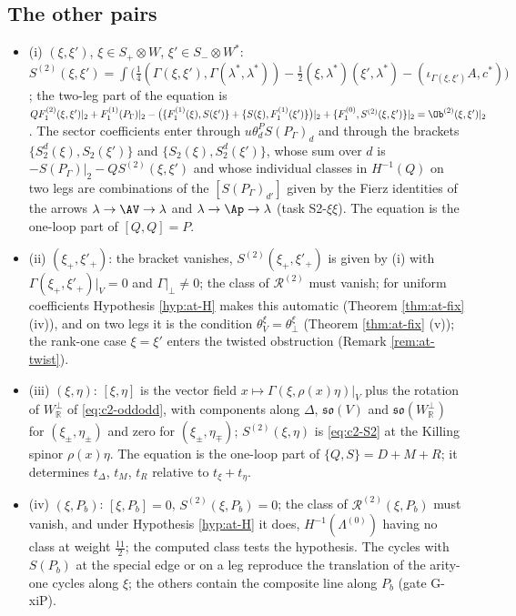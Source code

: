\subsection{The other pairs}

\begin{proposition}
\label{prop:at-pairs}
\leavevmode
\begin{itemize}
\item (i) $(\xi,\xi')$, $\xi\in S_+\otimes W$, $\xi'\in S_-\otimes W^*$: $S^{(2)}(\xi,\xi')=\int\big(\tfrac14(\Gamma(\xi,\xi'),\Gamma(\lambda^*,\lambda^*))-\tfrac12(\xi,\lambda^*)(\xi',\lambda^*)-(\iota_{\Gamma(\xi,\xi')}A,c^*)\big)$; the two-leg part of the equation is $QF_1^{(2)}(\xi,\xi')|_2+F_1^{(1)}(P_\Gamma)|_2-\big(\{F_1^{(1)}(\xi),S(\xi')\}+\{S(\xi),F_1^{(1)}(\xi')\}\big)|_2+\{F_1^{(0)},S^{(2)}(\xi,\xi')\}|_2=\Ob^{(2)}(\xi,\xi')|_2$. The sector coefficients enter through $u\theta^{P}_dS(P_\Gamma)_d$ and through the brackets $\{S^d_2(\xi),S_2(\xi')\}$ and $\{S_2(\xi),S^d_2(\xi')\}$, whose sum over $d$ is $-S(P_\Gamma)|_2-QS^{(2)}(\xi,\xi')$ and whose individual classes in $H^{-1}(Q)$ on two legs are combinations of the $[S(P_\Gamma)_{d'}]$ given by the Fierz identities of the arrows $\lambda\to\AV\to\lambda$ and $\lambda\to\Ap\to\lambda$ (task S2-$\xi\xi$). The equation is the one-loop part of $[Q,Q]=P$.
\item (ii) $(\xi_+,\xi'_+)$: the bracket vanishes, $S^{(2)}(\xi_+,\xi'_+)$ is given by (i) with $\Gamma(\xi_+,\xi'_+)|_V=0$ and $\Gamma|_\perp\ne0$; the class of $\mathcal R^{(2)}$ must vanish; for uniform coefficients Hypothesis \ref{hyp:at-H} makes this automatic (Theorem \ref{thm:at-fix} (iv)), and on two legs it is the condition $\theta^\xi_V=\theta^\xi_\perp$ (Theorem \ref{thm:at-fix} (v)); the rank-one case $\xi=\xi'$ enters the twisted obstruction (Remark \ref{rem:at-twist}).
\item (iii) $(\xi,\eta)$: $[\xi,\eta]$ is the vector field $x\mapsto\Gamma(\xi,\rho(x)\eta)|_V$ plus the rotation of $W^\perp_{\mathbb R}$ of \eqref{eq:c2-oddodd}, with components along $\Delta$, $\mathfrak{so}(V)$ and $\mathfrak{so}(W^\perp_{\mathbb R})$ for $(\xi_\pm,\eta_\pm)$ and zero for $(\xi_\pm,\eta_\mp)$; $S^{(2)}(\xi,\eta)$ is \eqref{eq:c2-S2} at the Killing spinor $\rho(x)\eta$. The equation is the one-loop part of $\{Q,S\}=D+M+R$; it determines $t_\Delta$, $t_M$, $t_R$ relative to $t_{\xi}+t_\eta$.
\item (iv) $(\xi,P_b)$: $[\xi,P_b]=0$, $S^{(2)}(\xi,P_b)=0$; the class of $\mathcal R^{(2)}(\xi,P_b)$ must vanish, and under Hypothesis \ref{hyp:at-H} it does, $H^{-1}(\Lambda^{(0)})$ having no class at weight $\tfrac{11}2$; the computed class tests the hypothesis. The cycles with $S(P_b)$ at the special edge or on a leg reproduce the translation of the arity-one cycles along $\xi$; the others contain the composite line along $P_b$ (gate G-xiP).

\end{itemize}
\end{proposition}
